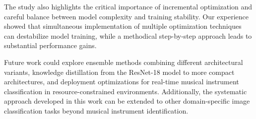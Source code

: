 The study also highlights the critical importance of incremental optimization and careful balance between model complexity and training stability. Our experience showed that simultaneous implementation of multiple optimization techniques can destabilize model training, while a methodical step-by-step approach leads to substantial performance gains.

Future work could explore ensemble methods combining different architectural variants, knowledge distillation from the ResNet-18 model to more compact architectures, and deployment optimizations for real-time musical instrument classification in resource-constrained environments. Additionally, the systematic approach developed in this work can be extended to other domain-specific image classification tasks beyond musical instrument identification.
